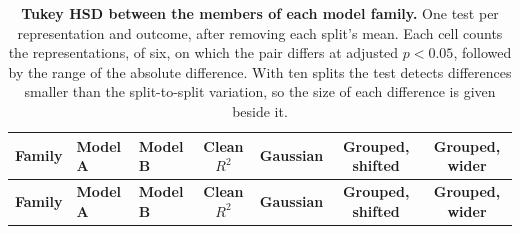 
{\scriptsize
\begin{longtable}{lllcccc}
\caption{\textbf{\SuppFile{} Tukey HSD between the members of each model family.}
One test per representation and outcome, after removing each split's mean. Each cell counts the representations, of six, on which the pair differs at adjusted $p < 0.05$, followed by the range of the absolute difference. With ten splits the test detects differences smaller than the split-to-split variation, so the size of each difference is given beside it.}
\label{supp:family_tukey}\\
\toprule
\textbf{Family} & \textbf{Model A} & \textbf{Model B} & \textbf{Clean $R^2$} & \textbf{Gaussian} & \textbf{Grouped, shifted} & \textbf{Grouped, wider} \\
\midrule
\endfirsthead
\toprule
\textbf{Family} & \textbf{Model A} & \textbf{Model B} & \textbf{Clean $R^2$} & \textbf{Gaussian} & \textbf{Grouped, shifted} & \textbf{Grouped, wider} \\
\midrule
\endhead

\bottomrule
\end{longtable}}
